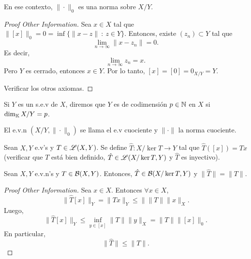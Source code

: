\begin{prop}
	En ese contexto, $\| \cdot \|_{0}$ es una norma sobre $X \slash Y$.
\end{prop}

\begin{proof}[Proof Other Information]
	Sea $x \in X$ tal que $\| [x] \|_{0} = 0 = \inf \{\| x - z \| \ : \ z \in Y\}$. Entonces, existe $(z_{n}) \subset Y$ tal que
	\[ \lim_{n \to \infty} \| x - z_{n} \| = 0. \]
	Es decir,
	\[ \lim_{n \to \infty} z_{n} = x. \]
	Pero $Y$ es cerrado, entonces $x \in Y$. Por lo tanto, $[x] = [0] = 0_{X \slash Y} = Y$. \par
	Verificar los otros axiomas.
\end{proof}

\begin{definition}
	Si $Y$ es un s.e.v de $X$, diremos que $Y$ es de codimensión $p \in \mathbb{N}$ en $X$ si $\dim_{\mathbb{K}} X \slash Y = p$.
\end{definition}

\begin{definition}
	El e.v.n $(X \slash Y, \| \cdot \|_{0})$ se llama el e.v cuociente y $\| \cdot \|$ la norma cuociente.
\end{definition}

\begin{remark}
	Sean $X,Y$ e.v's y $T \in \mathscr{L}(X,Y)$. Se define $\hat{T} \colon X \slash \ker T \to Y$ tal que $\hat{T}([x]) = Tx$ (verificar que $T$ está bien definido, $\hat{T} \in \mathscr{L}(X \slash \ker T, Y)$ y $\hat{T}$ es inyectivo).
\end{remark}

\begin{prop}
	Sean $X,Y$ e.v.n's y $T \in \mathcal{B}(X,Y)$. Entonces, $\hat{T} \in \mathcal{B}(X \slash \ker T, Y)$ y $\| \hat{T} \| = \| T \|$.
\end{prop}
\begin{proof}[Proof Other Information]
	Sea $x \in X$. Entonces $\forall x \in X$,
	\[ \| \hat{T}[x] \|_{Y} = \| T x \|_{Y} \leq \| \| T \| \| x \|_{X}. \]
	Luego,
	\[ \| \hat{T}[x] \|_{Y} \leq \inf_{y \in [x]} \| T \| \| y \|_{X} = \| T \| \| [x] \|_{0}. \]
	En particular,
	\[ \| \hat{T} \| \leq \| T \|. \]
\end{proof}
